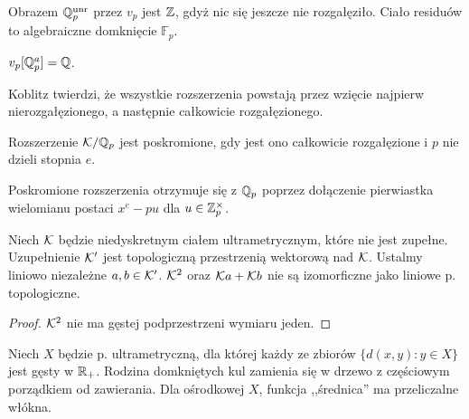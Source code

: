 \begin{fakt}
	Obrazem $\mathbb Q_p^{\textrm{unr}}$ przez $v_p$ jest $\mathbb Z$, gdyż nic się jeszcze nie rozgałęziło.
	Ciało residuów to algebraiczne domknięcie $\mathbb F_p$.
\end{fakt}

\begin{fakt}
	$v_p[\mathbb Q_p^a] = \mathbb Q$.
\end{fakt}

Koblitz twierdzi, że wszystkie rozszerzenia powstają przez wzięcie najpierw nierozgałęzionego, a następnie całkowicie rozgałęzionego.

\begin{definicja}
	Rozszerzenie $\mathcal K / \mathbb Q_p$ jest poskromione, gdy jest ono całkowicie rozgałęzione i $p$ nie dzieli stopnia $e$.
\end{definicja}

\begin{fakt}
	Poskromione rozszerzenia otrzymuje się z $\mathbb Q_p$ poprzez dołączenie pierwiastka wielomianu postaci $x^e - pu$ dla $u \in \mathbb Z_p^\times$.
\end{fakt}

\begin{fakt} %
	Niech $\mathcal K$ będzie niedyskretnym ciałem ultrametrycznym, które nie jest zupełne.
	Uzupełnienie $\mathcal K'$ jest topologiczną przestrzenią wektorową nad $\mathcal K$.
	Ustalmy liniowo niezależne $a, b \in \mathcal K'$.
	$\mathcal K^2$ oraz $\mathcal K a + \mathcal K b$ nie są izomorficzne jako liniowe p. topologiczne.
\end{fakt}

\begin{proof}
	$\mathcal K^2$ nie ma gęstej podprzestrzeni wymiaru jeden.
\end{proof}

\begin{fakt} %
	Niech $X$ będzie p. ultrametryczną, dla której każdy ze zbiorów $\{d(x,y) : y \in X\}$ jest gęsty w $\mathbb R_+$.
	Rodzina domkniętych kul zamienia się w drzewo z częściowym porządkiem od zawierania.
	Dla ośrodkowej $X$, funkcja ,,średnica'' ma przeliczalne włókna.
\end{fakt}